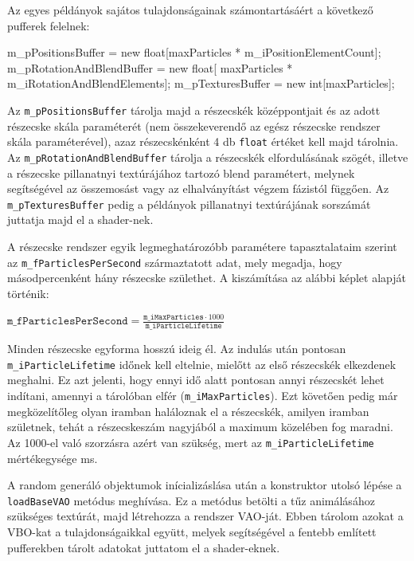 Az egyes példányok sajátos tulajdonságainak számontartásáért a következő pufferek felelnek:
\begin{cpp}
m_pPositionsBuffer = new float[maxParticles * m_iPositionElementCount];
m_pRotationAndBlendBuffer = new float[
			maxParticles * m_iRotationAndBlendElements];
m_pTexturesBuffer = new int[maxParticles];
\end{cpp}
Az \texttt{m\_pPositionsBuffer} tárolja majd a részecskék középpontjait és az adott részecske skála paraméterét (nem összekeverendő az egész részecske rendszer skála paraméterével), azaz részecskénként 4 db \texttt{float} értéket kell majd tárolnia. Az \texttt{m\_pRotationAnd\-BlendBuffer} tárolja a részecskék elfordulásának szögét, illetve a részecske pillanatnyi textúrájához tartozó blend paramétert, melynek segítségével az összemosást vagy az elhalványítást végzem fázistól függően. Az \texttt{m\_pTexturesBuffer} pedig a példányok pillanatnyi textúrájának sorszámát juttatja majd el a shader-nek.

A részecske rendszer egyik legmeghatározóbb paramétere tapasztalataim szerint az \texttt{m\_fParticlesPerSecond} származtatott adat, mely megadja, hogy másodpercenként hány részecske születhet. A kiszámítása az alábbi képlet alapját történik:

\begingroup
\Large
\begin{center}
$ \texttt{m\_fParticlesPerSecond} = \frac{\texttt{m\_iMaxParticles} \cdot 1000}{\texttt{m\_iParticleLifetime}}$
\end{center}
\endgroup
Minden részecske egyforma hosszú ideig él. Az indulás után pontosan \texttt{m\_iParticle\-Lifetime} időnek kell eltelnie, mielőtt az első részecskék elkezdenek meghalni. Ez azt jelenti, hogy ennyi idő alatt pontosan annyi részecskét lehet indítani, amennyi a tárolóban elfér (\texttt{m\_iMaxParticles}). Ezt követően pedig már megközelítőleg olyan iramban haláloznak el a részecskék, amilyen iramban születnek, tehát a részecskeszám nagyjából a maximum közelében fog maradni. Az 1000-el való szorzásra azért van szükség, mert az \texttt{m\_iParticleLifetime} mértékegysége ms.

A random generáló objektumok inícializáslása után a konstruktor utolsó lépése a \texttt{loadBaseVAO} metódus meghívása. Ez a metódus betölti a tűz animálásához szükséges textúrát, majd létrehozza a rendszer VAO-ját. Ebben tárolom azokat a VBO-kat a tulajdonságaikkal együtt, melyek segítségével a fentebb említett pufferekben tárolt adatokat juttatom el a shader-eknek. 

